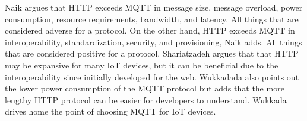 Naik argues that HTTP exceeds MQTT in message size, message overload, power consumption, resource requirements, bandwidth, and latency. 
All things that are considered adverse for a protocol.
On the other hand, HTTP exceeds MQTT in interoperability, standardization, security, and provisioning, Naik adds.\cite{Naik2017}
All things that are considered positive for a protocol.
Shariatzadeh argues that that HTTP may be expansive for many IoT devices, but it can be beneficial due to the interoperability since initially developed for the web.\cite{Shariatzadeh2016}
Wukkadada also points out the lower power consumption of the MQTT protocol but adds that the more lengthy HTTP protocol can be easier for developers to understand.
Wukkada drives home the point of choosing MQTT for IoT devices.\cite{Wukkadada2018}